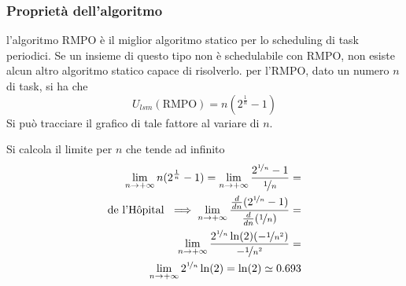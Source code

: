 \documentclass[10pt, letterpaper]{report}
\begin{document}
\subsubsection{Proprietà dell'algoritmo}
 l'algoritmo RMPO è il miglior algoritmo statico per lo scheduling di task periodici. Se un insieme 
di questo tipo non è schedulabile con RMPO, non esiste alcun altro algoritmo statico capace di risolverlo.\acc 
{} per l'RMPO, dato un numero $n$ di task, si ha che 
$$ U_{lsm}(\text{RMPO})=n(2^{\frac{1}{n}}-1)$$
Si può tracciare il grafico di tale fattore al variare di $n$.
\begin{center}
    \begin{figure}[h!]
       \centering
   \end{figure}
   \end{center}
Si calcola il limite per $n$ che tende ad infinito 
\begin{eqnarray}
    \lim_{n\rightarrow +\infty}n(2^{\frac{1}{n}}-1)=\lim_{n\rightarrow +\infty}\frac{2^{\nicefrac{1}{n}}-1}{\nicefrac{1}{n}} =  \\ 
    \text{de l'Hôpital }\implies  
    \lim_{n\rightarrow +\infty}\frac{\frac{d}{dn}(2^{\nicefrac{1}{n}}-1)}{\frac{d}{dn}(\nicefrac{1}{n})}= \\ 
    \lim_{n\rightarrow +\infty}\frac{2^{\nicefrac{1}{n}}\ln(2)(-\nicefrac{1}{n^2})}{-\nicefrac{1}{n^2}}
    = \\\lim_{n\rightarrow +\infty}2^{\nicefrac{1}{n}}\ln(2)=\ln(2)\simeq 0.693
\end{eqnarray}
\end{document}
